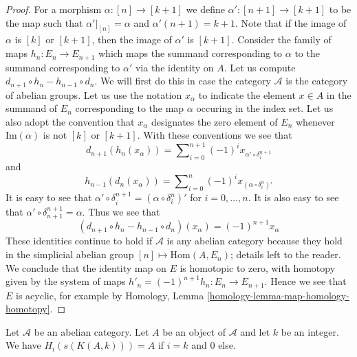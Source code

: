 \begin{proof}
For a morphism $\alpha : [n] \to [k + 1]$
we define $\alpha' : [n + 1] \to [k + 1]$ to be
the map such that $\alpha'|_{[n]} = \alpha$ and
$\alpha'(n + 1) = k + 1$. Note that if the
image of $\alpha$ is $[k]$ or $[k + 1]$, then
the image of $\alpha'$ is $[k + 1]$.
Consider the family of
maps $h_n : E_n \to E_{n + 1}$ which maps
the summand corresponding to $\alpha$ to
the summand corresponding to $\alpha'$ via
the identity on $A$. 
Let us compute $d_{n + 1} \circ h_n - h_{n - 1} \circ d_n$.
We will first do this in case the category $\mathcal{A}$ is
the category of abelian groups.
Let us use the notation $x_\alpha$ to indicate
the element $x \in A$ in the summand of $E_n$ corresponding
to the map $\alpha$ occuring in the index set.
Let us also adopt the convention that
$x_\alpha$ designates the zero element of $E_n$
whenever $\text{Im}(\alpha)$ is not $[k]$ or $[k + 1]$.
With these conventions we see that
$$
d_{n + 1}(h_n(x_\alpha)) =
\sum\nolimits_{i = 0}^{n + 1} (-1)^i x_{\alpha' \circ \delta^{n + 1}_i}
$$
and 
$$
h_{n - 1}(d_n(x_\alpha)) =
\sum\nolimits_{i = 0}^n (-1)^i x_{(\alpha \circ \delta_i^n)'}
$$
It is easy to see that
$\alpha' \circ \delta^{n + 1}_i = (\alpha \circ \delta_i^n)'$
for $i = 0, \ldots, n$. It is also easy to see that
$\alpha' \circ \delta^{n + 1}_{n + 1} = \alpha$. Thus we
see that
$$
(d_{n + 1} \circ h_n - h_{n - 1} \circ d_n)(x_\alpha)
=
(-1)^{n + 1} x_\alpha
$$
These identities continue to hold if $\mathcal{A}$ is any abelian
category because they hold in the simplicial abelian group
$[n] \mapsto \text{Hom}(A, E_n)$; details left to the reader.
We conclude that the identity map on $E$ is
homotopic to zero, with homotopy given by the 
system of maps $h'_n = (-1)^{n + 1}h_n : E_n \to E_{n + 1}$.
Hence we see that $E$ is acyclic, for
example by Homology, Lemma \ref{homology-lemma-map-homology-homotopy}.
\end{proof}

\begin{lemma}
\label{lemma-homology-eilenberg-maclane}
Let $\mathcal{A}$ be an abelian category.
Let $A$ be an object of $\mathcal{A}$ and
let $k$ be an integer. We have
$H_i(s(K(A, k))) = A$ if $i = k$ and
$0$ else.
\end{lemma}

